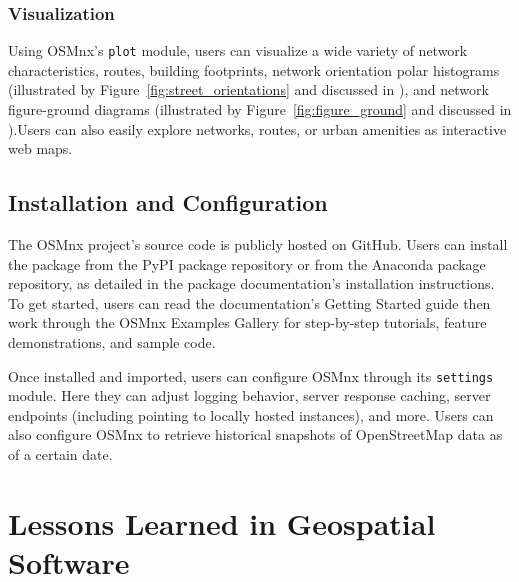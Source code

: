 \documentclass[12pt,letterpaper]{article} %
\begin{document}
\subsubsection{Visualization}

Using OSMnx's \texttt{plot} module, users can visualize a wide variety of network characteristics, routes, building footprints, network orientation polar histograms (illustrated by Figure~\ref{fig:street_orientations} and discussed in \citet{boeing_urban_2019}), and network figure-ground diagrams (illustrated by Figure~\ref{fig:figure_ground} and discussed in \citet{boeing_spatial_2021}).Users can also easily explore networks, routes, or urban amenities as interactive web maps.

\subsection{Installation and Configuration}

The OSMnx project's source code is publicly hosted on GitHub. Users can install the package from the PyPI package repository or from the Anaconda package repository, as detailed in the package documentation's installation instructions. To get started, users can read the documentation's Getting Started guide then work through the OSMnx Examples Gallery for step-by-step tutorials, feature demonstrations, and sample code.

Once installed and imported, users can configure OSMnx through its \texttt{settings} module. Here they can adjust logging behavior, server response caching, server endpoints (including pointing to locally hosted instances), and more. Users can also configure OSMnx to retrieve historical snapshots of OpenStreetMap data as of a certain date.

\section{Lessons Learned in Geospatial Software}
\end{document}

